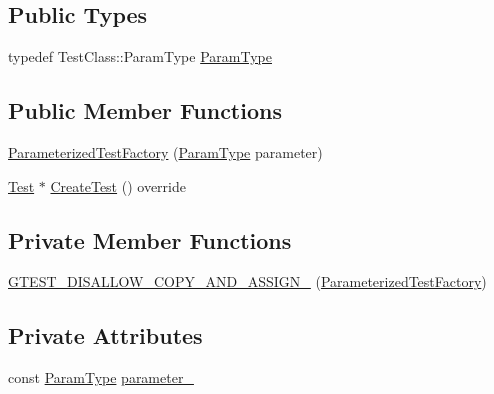 \subsection*{Public Types}
\begin{DoxyCompactItemize}
\item 
typedef Test\+Class\+::\+Param\+Type \hyperlink{classtesting_1_1internal_1_1ParameterizedTestFactory_ad9a27b8e1a83de2f1687625bccff460d}{Param\+Type}
\end{DoxyCompactItemize}
\subsection*{Public Member Functions}
\begin{DoxyCompactItemize}
\item 
\hyperlink{classtesting_1_1internal_1_1ParameterizedTestFactory_a82d78356cd402224255edec760a048fb}{Parameterized\+Test\+Factory} (\hyperlink{classtesting_1_1internal_1_1ParameterizedTestFactory_ad9a27b8e1a83de2f1687625bccff460d}{Param\+Type} parameter)
\item 
\hyperlink{classtesting_1_1Test}{Test} $\ast$ \hyperlink{classtesting_1_1internal_1_1ParameterizedTestFactory_a36d962674d7bf845398637338b9f75cb}{Create\+Test} () override
\end{DoxyCompactItemize}
\subsection*{Private Member Functions}
\begin{DoxyCompactItemize}
\item 
\hyperlink{classtesting_1_1internal_1_1ParameterizedTestFactory_ac70e70bd61d0f66bbc68ed2587c42d92}{G\+T\+E\+S\+T\+\_\+\+D\+I\+S\+A\+L\+L\+O\+W\+\_\+\+C\+O\+P\+Y\+\_\+\+A\+N\+D\+\_\+\+A\+S\+S\+I\+G\+N\+\_\+} (\hyperlink{classtesting_1_1internal_1_1ParameterizedTestFactory}{Parameterized\+Test\+Factory})
\end{DoxyCompactItemize}
\subsection*{Private Attributes}
\begin{DoxyCompactItemize}
\item 
const \hyperlink{classtesting_1_1internal_1_1ParameterizedTestFactory_ad9a27b8e1a83de2f1687625bccff460d}{Param\+Type} \hyperlink{classtesting_1_1internal_1_1ParameterizedTestFactory_a9ee3e72cb3b169924b5328009ed48b5e}{parameter\+\_\+}
\end{DoxyCompactItemize}
